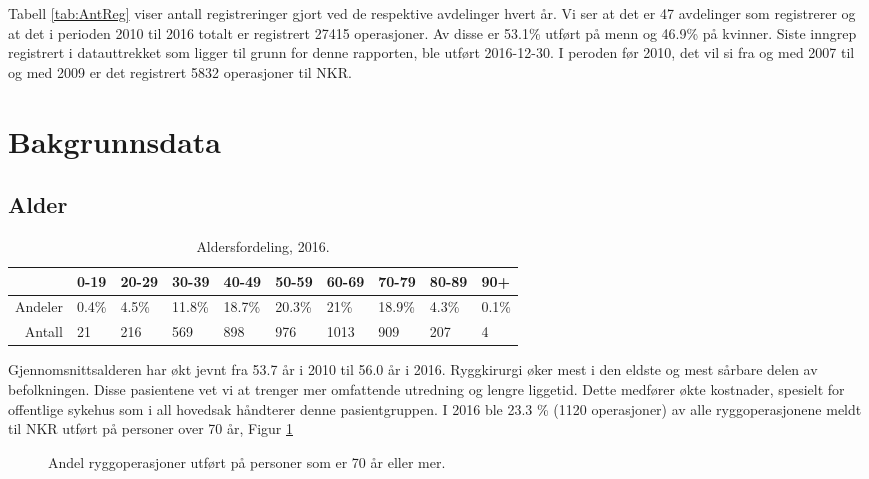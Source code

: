 Tabell \ref{tab:AntReg} viser antall 
registreringer gjort ved de respektive avdelinger hvert år. Vi ser at det er  
47 avdelinger som registrerer og at det i perioden 2010 til 2016 totalt er registrert 27415 
operasjoner. Av disse er 53.1\% utført på menn og 46.9\% på kvinner.
Siste inngrep registrert i datauttrekket som ligger til grunn for denne rapporten, ble utført 
2016-12-30. I peroden før 2010, det vil si fra og med 2007 til og med 2009 er det registrert 5832 operasjoner til NKR. 

\clearpage



\section{Bakgrunnsdata}
\subsection{Alder}


\begin{table}[ht]
\centering
\begin{tabular}{rlllllllll}
  \hline
 & 0-19 & 20-29 & 30-39 & 40-49 & 50-59 & 60-69 & 70-79 & 80-89 & 90+ \\ 
  \hline
Andeler & 0.4\% & 4.5\% & 11.8\% & 18.7\% & 20.3\% & 21\% & 18.9\% & 4.3\% & 0.1\% \\ 
  Antall & 21 & 216 & 569 & 898 & 976 & 1013 & 909 & 207 & 4 \\ 
   \hline
\end{tabular}
\caption{Aldersfordeling, 2016.} 
\label{tab:Alder}
\end{table}


Gjennomsnittsalderen har økt jevnt fra 53.7 år i 2010 til 56.0 år i 2016. 
Ryggkirurgi øker mest i den eldste og mest sårbare delen av
befolkningen. Disse pasientene vet vi at trenger mer omfattende utredning og
lengre liggetid. Dette medfører økte kostnader, spesielt for offentlige sykehus som i
all hovedsak håndterer denne pasientgruppen. I 2016 ble 23.3 \% (1120 operasjoner) av alle ryggoperasjonene meldt til NKR utført på personer over 70 år, Figur \ref{fig:FigAlder70}

\begin{figure}[ht]
\caption{Andel ryggoperasjoner utført på personer som er 70 år eller mer.}
\label{fig:FigAlder70}
\end{figure}



